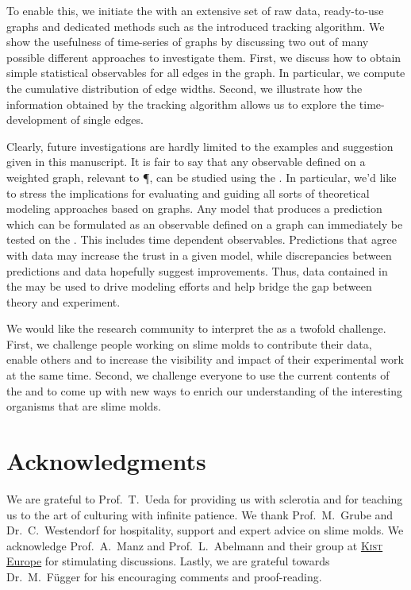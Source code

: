 	To enable this, we initiate the \SMGR with an extensive set of raw data, ready-to-use graphs and dedicated methods such as the introduced tracking algorithm. We show the usefulness of time-series of graphs by discussing two out of many possible different approaches to investigate them. First, we discuss how to obtain simple statistical observables for all edges in the graph. In particular, we compute the cumulative distribution of edge widths. Second, we illustrate how the information obtained by the tracking algorithm allows us to explore the time-development of single edges.

	Clearly, future investigations are hardly limited to the examples and suggestion given in this manuscript. It is fair to say that any observable defined on a weighted graph, relevant to \P, can be studied using the \data. In particular, we'd like to stress the implications for evaluating and guiding all sorts of theoretical modeling approaches based on graphs. Any model that produces a prediction which can be formulated as an observable defined on a graph can immediately be tested on the \data. This includes time dependent observables. Predictions that agree with \SMGR data may increase the trust in a given model, while discrepancies between predictions and data hopefully suggest improvements. Thus, data contained in the \data may be used to drive modeling efforts and help bridge the gap between theory and experiment.

	We would like the research community to interpret the \SMGR as a twofold challenge. First, we challenge people working on slime molds to contribute their data, enable others and to increase the visibility and impact of their experimental work at the same time. Second, we challenge everyone to use the current contents of the \SMGR and to come up with new ways to enrich our understanding of the interesting organisms that are slime molds.
	   
\section{Acknowledgments}

	We are grateful to Prof.~T.~Ueda for providing us with sclerotia and for teaching us to the art of culturing \Pp with infinite patience. We thank Prof.~M.~Grube and Dr.~C.~Westendorf for hospitality, support and expert advice on slime molds. We acknowledge Prof.~A.~Manz and Prof.~L.~Abelmann and their group at \href{www.kist-europe.de}{\textsc{Kist} Europe} for stimulating discussions. Lastly, we are grateful towards Dr.~M.~F\"ugger for his encouraging comments and proof-reading.
